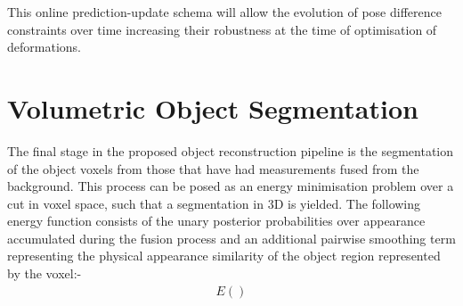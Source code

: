 This online prediction-update schema will allow the evolution of pose difference constraints over time increasing their robustness at the time 
of optimisation of deformations.

\section{Volumetric Object Segmentation}
The final stage in the proposed object reconstruction pipeline is the segmentation of the object voxels from those that have had measurements fused 
from the background. This process can be posed as an energy minimisation problem over a cut in voxel space, such that a segmentation in 3D is yielded. The 
following energy function consists of the unary posterior probabilities over appearance accumulated during the fusion process and an additional pairwise 
smoothing term representing the physical appearance similarity of the object region represented by the voxel:-
\begin{equation}
\begin{split}
E()
\end{split}
\end{equation}